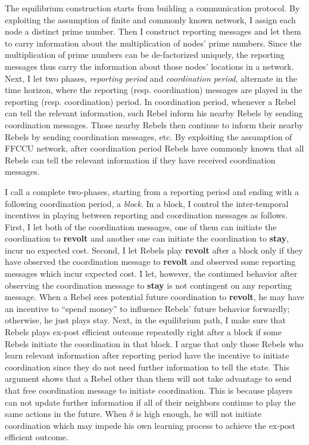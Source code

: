 \documentclass[12pt,letterpaper]{article}
\theoremstyle{definition}
\theoremstyle{remark}
\theoremstyle{claim}
\begin{document}
The equilibrium construction starts from building a communication protocol. By exploiting the assumption of finite and commonly known network, I assign each node a distinct prime number. Then I construct reporting messages and let them to carry information about the multiplication of nodes' prime numbers. Since the multiplication of prime numbers can be de-factorized uniquely, the reporting messages thus carry the information about those nodes' locations in a network. Next, I let two phases, \textit{reporting period} and \textit{coordination period}, alternate in the time horizon, where the reporting (resp. coordination) messages are played in the reporting (resp. coordination) period. In coordination period, whenever a Rebel can tell the relevant information, such Rebel inform his nearby Rebels by sending coordination messages. Those nearby Rebels then continue to inform their nearby Rebels by sending coordination messages, etc. By exploiting the assumption of FFCCU network, after coordination period Rebels have commonly known that all Rebels can tell the relevant information if they have received coordination messages.

I call a complete two-phases, starting from a reporting period and ending with a following coordination period, a \textit{block}. In a block, I control the inter-temporal incentives in playing between reporting and coordination messages as follows. First, I let both of the coordination messages, one of them can initiate the coordination to \textbf{revolt} and another one can initiate the coordination to \textbf{stay}, incur no expected cost. Second, I let Rebels play \textbf{revolt} after a block only if they have observed the coordination message to \textbf{revolt} and observed some reporting messages which incur expected cost. I let, however, the continued behavior after observing the coordination message to \textbf{stay} is not contingent on any reporting message. When a Rebel sees potential future coordination to \textbf{revolt}, he may have an incentive to ``spend money'' to influence Rebels' future behavior forwardly; otherwise, he just plays stay. Next, in the equilibrium path, I make sure that Rebels plays ex-post efficient outcome repeatedly right after a block if some Rebels initiate the coordination in that block. I argue that only those Rebels who learn relevant information after reporting period have the incentive to initiate coordination since they do not need further information to tell the state. This argument shows that a Rebel other than them will not take advantage to send that free coordination message to initiate coordination. This is because players can not update further information if all of their neighbors continue to play the same actions in the future. When $\delta$ is high enough, he will not initiate coordination which may impede his own learning process to achieve the ex-post efficient outcome.
\end{document}
